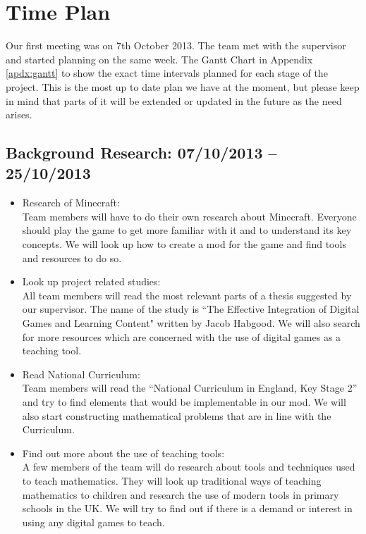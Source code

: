 \chapter{Time Plan}

Our first meeting was on 7th October 2013. The team met with the supervisor and started 
planning on the same week. The Gantt Chart in Appendix \ref{apdx:gantt} to show the 
exact time intervals planned for each stage of the project. This is the most up to date
plan we have at the moment, but please keep in mind that parts of it will be extended 
or updated in the future as the need arises.

\section{Background Research: 07/10/2013 -- 25/10/2013}
\begin{itemize}
\item{Research of Minecraft:\\Team members will have to do their own research about Minecraft. Everyone should play the game to get more familiar with it and to understand its key concepts. We will look up how to create a mod for the game and find tools and resources to do so.}

\item{Look up project related studies:\\All team members will read the most relevant parts of a thesis suggested by our supervisor. The name of the study is “The Effective Integration of Digital Games and Learning Content" written by Jacob Habgood. We will also search for more resources which are concerned with the use of digital games as a teaching tool.}


\item{Read National Curriculum:\\Team members will read the ``National Curriculum in England, Key Stage 2'' and try to find elements that would be implementable in our mod. We will also start constructing mathematical problems that are in line with the Curriculum.}

\item{Find out more about the use of teaching tools:\\A few members of the team will do research about tools and techniques used to teach mathematics. They will look up traditional ways of teaching mathematics to children and research the use of modern tools in primary schools in the UK. We will try to find out if there is a demand or interest in using any digital games to teach.}
\end{itemize}

